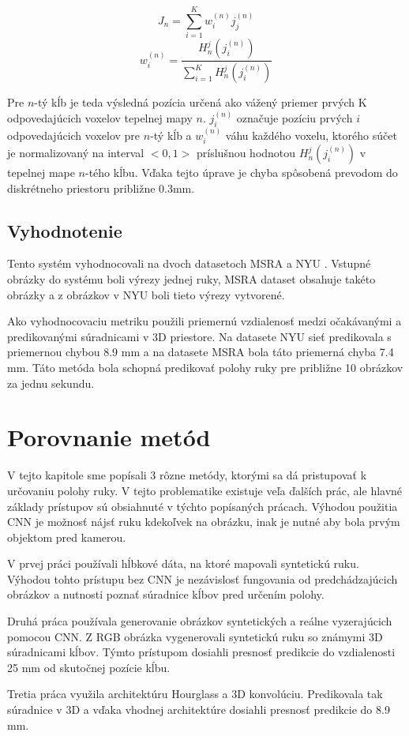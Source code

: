 \begin{equation}\label{eqn:postprocessing}
    J_n = \sum_{i=1}^K{w_i^{(n)}}j_j^{(n)}
\end{equation}
\begin{equation}
    w_i^{(n)} = \frac{H_n^j(j_i^{(n)})}{\sum_{i=1}^{K}{H_n^j({j_i^{(n)}})}}
\end{equation}

Pre $n$-tý kĺb je teda výsledná pozícia určená ako vážený priemer prvých K odpovedajúcich voxelov tepelnej mapy $n$. $j_i^{(n)}$ označuje pozíciu prvých $i$ odpovedajúcich voxelov pre $n$-tý kĺb a $w_i^{(n)}$ váhu každého voxelu, ktorého súčet je normalizovaný na interval $<0,1>$ príslušnou hodnotou $H_n^j(j_i^{(n)})$ v tepelnej mape $n$-tého kĺbu. Vďaka tejto úprave je chyba spôsobená prevodom do diskrétneho priestoru približne 0.3mm.

\subsection{Vyhodnotenie}
Tento systém vyhodnocovali na dvoch datasetoch MSRA \cite{Sun_2015_CVPR} a NYU \cite{tompson14tog}. Vstupné obrázky do systému boli výrezy jednej ruky, MSRA dataset obsahuje takéto obrázky a z obrázkov v NYU boli tieto výrezy vytvorené. 

Ako vyhodnocovaciu metriku použili priemernú vzdialenosť medzi očakávanými a predikovanými súradnicami v 3D priestore. Na datasete NYU sieť predikovala s priemernou chybou 8.9 mm a na datasete MSRA bola táto priemerná chyba 7.4 mm. Táto metóda bola schopná predikovať polohy ruky pre približne 10 obrázkov za jednu sekundu.

\section{Porovnanie metód}
V tejto kapitole sme popísali 3 rôzne metódy, ktorými sa dá pristupovať k určovaniu polohy ruky. V tejto problematike existuje veľa ďalších prác, ale hlavné základy prístupov sú obsiahnuté v týchto popísaných prácach. Výhodou použitia CNN je možnosť nájsť ruku kdekoľvek na obrázku, inak je nutné aby bola prvým objektom pred kamerou.

V prvej práci používali hĺbkové dáta, na ktoré mapovali syntetickú ruku. Výhodou tohto prístupu bez CNN je nezávislosť fungovania od predchádzajúcich obrázkov a nutnosti poznať súradnice kĺbov pred určením polohy.

Druhá práca používala generovanie obrázkov syntetických a reálne vyzerajúcich pomocou CNN. Z RGB obrázka vygenerovali syntetickú ruku so známymi 3D súradnicami kĺbov. Týmto prístupom dosiahli presnosť predikcie do vzdialenosti 25 mm od skutočnej pozície kĺbu.

Tretia práca využila architektúru Hourglass a 3D konvolúciu. Predikovala tak súradnice v 3D a vďaka vhodnej architektúre dosiahli presnosť predikcie do 8.9 mm.